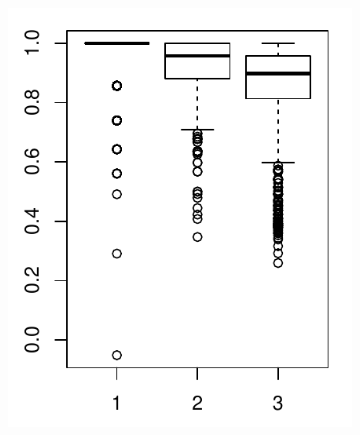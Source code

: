 \begin{figure}[H]
\begin{subfigure}{.45\textwidth}
\includegraphics[width=\linewidth]{../simulation/plots/ARIall_123_boxplot}
\caption{}
\label{fig: ARI boxplot cmpr, all clus}
\end{subfigure}
\begin{subfigure}{.45\textwidth}

\end{subfigure}
\end{figure}
